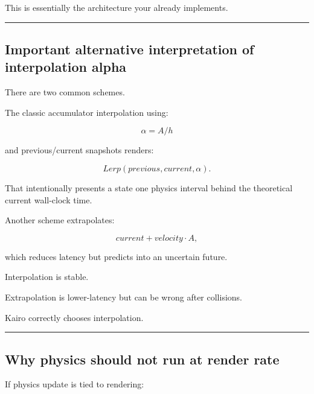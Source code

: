 This is essentially the architecture your  already implements.

\begin{center}\rule{0.5\linewidth}{0.5pt}\end{center}

\subsection{Important alternative interpretation of interpolation alpha}\label{06-engine-ii-ch038-important-alternative-interpretation-of-interpolation-alpha}

\hypertarget{06-engine-ii-ch038-important-alternative-interpretation-of-interpolation-alpha}{}

There are two common schemes.

The classic accumulator interpolation using:

\[
\alpha=A/h
\]

and previous/current snapshots renders:

\[
Lerp(previous,current,\alpha).
\]

That intentionally presents a state one physics interval behind the theoretical current wall-clock time.

Another scheme extrapolates:

\[
current + velocity\cdot A,
\]

which reduces latency but predicts into an uncertain future.

Interpolation is stable.

Extrapolation is lower-latency but can be wrong after collisions.

Kairo correctly chooses interpolation.

\begin{center}\rule{0.5\linewidth}{0.5pt}\end{center}

\subsection{Why physics should not run at render rate}\label{06-engine-ii-ch038-why-physics-should-not-run-at-render-rate}

\hypertarget{06-engine-ii-ch038-why-physics-should-not-run-at-render-rate}{}

If physics update is tied to rendering:

